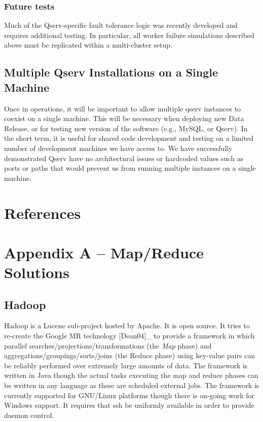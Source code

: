 \documentclass[DM,lsstdraft,toc]{lsstdoc}
\begin{document}
\subsubsection{Future tests}\label{future-tests}

Much of the Qserv-specific fault tolerance logic was recently developed
and requires additional testing. In particular, all worker failure
simulations described above must be replicated within a multi-cluster
setup.

\subsection{Multiple Qserv Installations on a Single
Machine}\label{multiple-qserv-installations-on-a-single-machine}

Once in operations, it will be important to allow multiple qserv
instances to coexist on a single machine. This will be necessary when
deploying new Data Release, or for testing new version of the software
(e.g., MySQL, or Qserv). In the short term, it is useful for shared code
development and testing on a limited number of development machines we
have access to. We have successfully demonstrated Qserv have no
architectural issues or hardcoded values such as ports or paths that
would prevent us from running multiple instances on a single machine.

\section{References}\label{references}

\section{Appendix A -- Map/Reduce
Solutions}\label{appendix-a-mapreduce-solutions}

\subsection{Hadoop}\label{hadoop}

Hadoop is a Lucene sub-project hosted by Apache. It is open source. It
tries to re-create the Google MR technology {[}Dean04{]}\_ to provide a
framework in which parallel searches/projections/transformations (the
\emph{Map} phase) and aggregations/groupings/sorts/joins (the Reduce
phase) using key-value pairs can be reliably performed over extremely
large amounts of data. The framework is written in Java though the
actual tasks executing the map and reduce phases can be written in any
language as these are scheduled external jobs. The framework is
currently supported for GNU/Linux platforms though there is on-going
work for Windows support. It requires that ssh be uniformly available in
order to provide daemon control.
\end{document}
